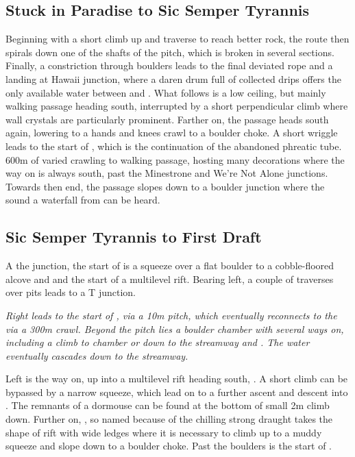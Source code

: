 \subsection{Stuck in Paradise to Sic Semper Tyrannis}
Beginning with a short climb up and traverse to reach better rock, the route then spirals down one of the shafts of the pitch, which is broken in several sections. Finally, a constriction through boulders leads to the final deviated rope and a landing at Hawaii junction, where a daren drum full of collected drips offers the only available water between  and . What follows is a low ceiling, but mainly walking passage heading south, interrupted by a short perpendicular climb where wall crystals are particularly prominent. Farther on, the passage heads south again, lowering to a hands and knees crawl to a boulder choke. A short wriggle leads to the start of , which is the continuation of the abandoned phreatic tube. 600m of varied crawling to walking passage, hosting many decorations  where the way on is always south, past the Minestrone and We're Not Alone junctions. Towards then end, the passage slopes down to a boulder junction where the sound a waterfall from  can be heard. 

\subsection{Sic Semper Tyrannis to First Draft}
A the junction, the start of  is a squeeze over a flat boulder to a cobble-floored alcove and and the start of a multilevel rift. Bearing left, a couple of traverses over pits leads to a T junction. 

\textit{Right leads to the start of , via a 10m pitch, which eventually reconnects to the  via a 300m crawl. Beyond the pitch lies a boulder chamber with several ways on, including a climb to  chamber or down to the streamway and . The water eventually cascades down to the  streamway.}

Left is the way on, up into a multilevel rift heading south, . A short climb can be bypassed by a narrow squeeze, which lead on to a further ascent and descent into . The remnants of a dormouse can be found at the bottom of small 2m climb down. Further on, , so named because of the chilling strong draught takes the shape of rift with wide ledges where it is necessary to climb up to a muddy squeeze and slope down to a boulder choke. Past the boulders is the start of .

